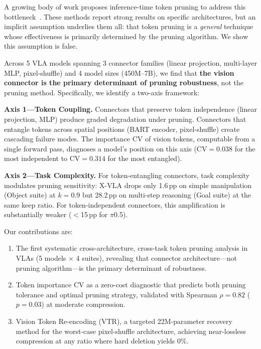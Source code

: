 \documentclass[10pt,twocolumn]{article}
\begin{document}
A growing body of work proposes inference-time token pruning to address this bottleneck~\cite{chen2024fastv,tang2024vlaiap,zhang2024lightvla}.
These methods report strong results on specific architectures, but an implicit assumption underlies them all: that token pruning is a \emph{general} technique whose effectiveness is primarily determined by the pruning algorithm.
We show this assumption is false.

Across 5 VLA models spanning 3 connector families (linear projection, multi-layer MLP, pixel-shuffle) and 4 model sizes (450M--7B), we find that \textbf{the vision connector is the primary determinant of pruning robustness}, not the pruning method.
Specifically, we identify a two-axis framework:

\noindent\textbf{Axis 1---Token Coupling.} Connectors that preserve token independence (linear projection, MLP) produce graded degradation under pruning.
Connectors that entangle tokens across spatial positions (BART encoder, pixel-shuffle) create cascading failure modes.
The importance CV of vision tokens, computable from a single forward pass, diagnoses a model's position on this axis ($\text{CV}=0.038$ for the most independent to $\text{CV}=0.314$ for the most entangled).

\noindent\textbf{Axis 2---Task Complexity.} For token-entangling connectors, task complexity modulates pruning sensitivity: X-VLA drops only 1.6\,pp on simple manipulation (Object suite) at $k\!=\!0.9$ but 28.2\,pp on multi-step reasoning (Goal suite) at the same keep ratio.
For token-independent connectors, this amplification is substantially weaker ($<$15\,pp for $\pi$0.5).

Our contributions are:
\begin{enumerate}
\item The first systematic cross-architecture, cross-task token pruning analysis in VLAs (5 models $\times$ 4 suites), revealing that connector architecture---not pruning algorithm---is the primary determinant of robustness.
\item Token importance CV as a zero-cost diagnostic that predicts both pruning tolerance and optimal pruning strategy, validated with Spearman $\rho=0.82$ ($p=0.03$) at moderate compression.
\item Vision Token Re-encoding (VTR), a targeted 22M-parameter recovery method for the worst-case pixel-shuffle architecture, achieving near-lossless compression at any ratio where hard deletion yields 0\%.
\end{enumerate}
\end{document}
